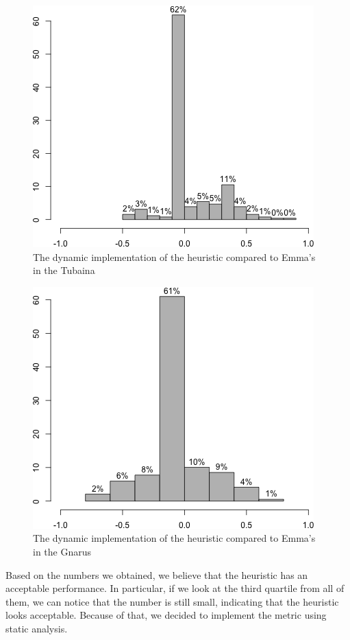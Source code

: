\documentclass{sig-alternate}
\begin{document}
\begin{figure}[h!H]
  \centering
  \includegraphics[scale=0.35]{../stats/tubaina-histograma-aspectj.png}
  \caption{The dynamic implementation of the heuristic compared to Emma's in the Tubaina}
  \label{fig:tubaina-aj}
\end{figure}

\begin{figure}[h!H]
  \centering
  \includegraphics[scale=0.35]{../stats/gnarus-histograma-aspectj.png}
  \caption{The dynamic implementation of the heuristic compared to Emma's in the Gnarus}
  \label{fig:gnarus-aj}
\end{figure}

Based on the numbers we obtained, we believe that the heuristic has an acceptable performance. 
In particular, if we look at the third quartile from all of them, we can notice that the number is
still small, indicating that the heuristic looks acceptable. Because of that,
we decided to implement the metric using static analysis. 
\end{document}
